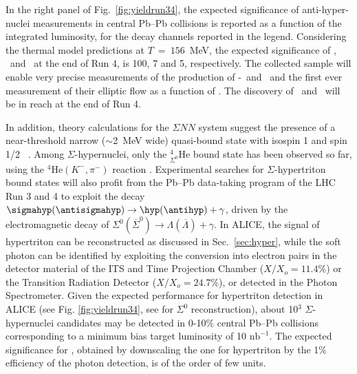 In the right panel of Fig.~\ref{fig:yieldrun34}, the expected significance of anti-hyper-nuclei measurements in central Pb--Pb collisions is reported as a function of the integrated luminosity, for the decay channels reported in the legend. 
Considering the thermal model predictions at $T~=~156$~MeV, the expected significance 
of \antihyp, \antihypfour\ and \antihehypfour\ at the end of Run 4, is 100, 7 and 5, respectively. 
The collected sample will enable very precise measurements of the production of \hyp\ and \antihyp\ and the first ever measurement of their elliptic flow as a function of \pT.
The discovery of \antihypfour\ and \antihehypfour\ will be in reach at the end of Run 4.

In addition, theory calculations for the $\Sigma NN$ system suggest the presence of a near-threshold narrow ($\sim$2~MeV wide) quasi-bound state with isospin 1 and spin 1/2 ~\cite{cite:SigmaTriton-theory}. Among $\Sigma$-hypernuclei, only the $_{\Sigma^0}^{4}\mathrm{He}$ bound state has been observed so far, using the ${^4}\mathrm{He}(K^-,\pi^-)$ reaction \cite{cite:SigmaTriton-data}.
Experimental searches for $\Sigma$-hypertriton bound states will also profit from the Pb--Pb data-taking program of the LHC Run 3 and 4 to exploit the decay
$\sigmahyp (\antisigmahyp) \rightarrow \hyp (\antihyp) + \gamma$, driven by
the electromagnetic decay of 
$\Sigma^{0}(\overline{\Sigma}^{0}) \rightarrow \Lambda(\overline{\Lambda}) + \gamma$.
%
In ALICE, the signal of hypertriton can be reconstructed as discussed in Sec.~\ref{sec:hyper}, while the soft photon can be identified by exploiting the conversion into electron pairs in the detector material of the ITS and Time Projection Chamber ($X/X_o = 11.4 \%$) or the Transition Radiation Detector ($X/X_o = 24.7 \%$), or detected in the Photon Spectrometer.
Given the expected performance for hypertriton detection in ALICE (see Fig. \ref{fig:yieldrun34}, see \cite{Borissov:2015ura} for $\Sigma^{0}$ reconstruction), about 10$^3$ $\Sigma$-hypernuclei candidates may be detected in 0-10$\%$ central Pb--Pb collisions corresponding to a minimum bias target luminosity of 10 $\mathrm{nb}^{-1}$. 
The expected significance for \sigmahyp, obtained by downscaling the one for hypertriton by the 1$\%$ efficiency of the photon detection, is of the order of few units. 

